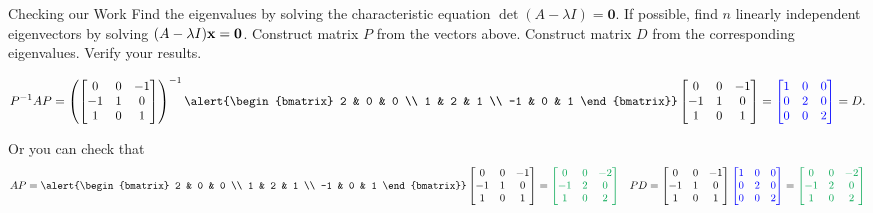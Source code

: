 \documentclass[xcolor=dvipsnames,aspectratio=169,t]{beamer}
\begin{document}
\begin{frame}{Checking our Work}
  \bb
  \ii Find the eigenvalues by solving the characteristic equation $\det (A - \lambda I) = \mathbf{0}$.
  \ii If possible, find $n$ linearly independent eigenvectors by solving $(A - \lambda I) \mathbf{x} = \mathbf{0}$.
  \ii Construct matrix $P$ from the vectors above.
  \ii Construct matrix $D$ from the corresponding eigenvalues.
  \ii \alert{Verify your results.}
  \ee

  \pause
  \[ P^{-1} A P = \left( \begin{bmatrix} 0 &0 & -1 \\ -1 & 1 & 0 \\ 1 & 0 & 1 \end{bmatrix}  \right)^{-1} 
  \alert{\begin{bmatrix} 2 & 0 & 0 \\ 1 & 2 & 1 \\ -1 & 0 & 1 \end{bmatrix}} 
  \begin{bmatrix} 0 &0 & -1 \\ -1 & 1 & 0 \\ 1 & 0 & 1 \end{bmatrix} = 
  \colorb{\begin{bmatrix} 1 & 0 & 0 \\ 0 & 2 & 0 \\ 0 & 0 & 2 \end{bmatrix}} = D.\]

  \pause
  Or you can check that
  {\scriptsize
  \[ AP = \alert{\begin{bmatrix} 2 & 0 & 0 \\ 1 & 2 & 1 \\ -1 & 0 & 1 \end{bmatrix}}
  \begin{bmatrix} 0 &0 & -1 \\ -1 & 1 & 0 \\ 1 & 0 & 1 \end{bmatrix} 
  = \colorg{\begin{bmatrix} 0 & 0 & -2 \\ -1 & 2 & 0 \\ 1 & 0 & 2 \end{bmatrix}}
  \quad  
  PD = \begin{bmatrix} 0 &0 & -1 \\ -1 & 1 & 0 \\ 1 & 0 & 1 \end{bmatrix} 
  \colorb{\begin{bmatrix} 1 & 0 & 0 \\ 0 & 2 & 0 \\ 0 & 0 & 2 \end{bmatrix}}
  = \colorg{\begin{bmatrix} 0 & 0 & -2 \\ -1 & 2 & 0 \\ 1 & 0 & 2 \end{bmatrix}} \]}
\end{frame}
\end{document}
